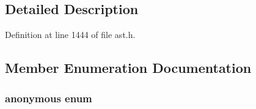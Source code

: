 \subsection{Detailed Description}


Definition at line 1444 of file ast.h.



\subsection{Member Enumeration Documentation}
\hypertarget{classmocha_1_1_compare_exp_aa5ba2ba7107f66e1ffc940a3d09b12b3}{
\subsubsection[{"@11}]{\setlength{\rightskip}{0pt plus 5cm}anonymous enum}}
\label{classmocha_1_1_compare_exp_aa5ba2ba7107f66e1ffc940a3d09b12b3}
